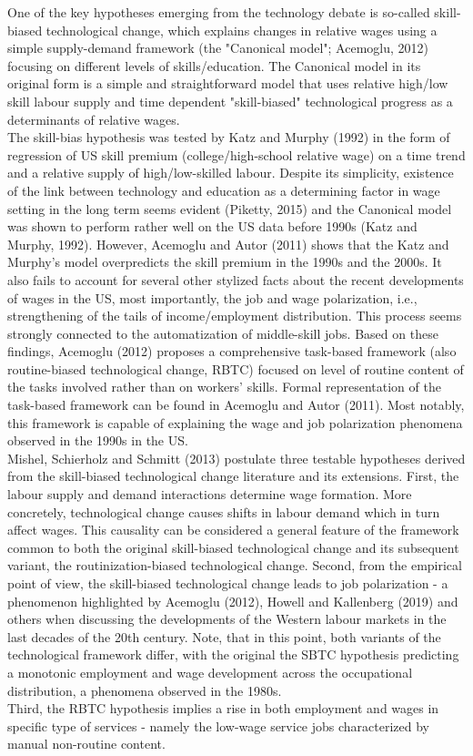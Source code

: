 \documentclass{article}
\begin{document}
One of the key hypotheses emerging from the technology debate is so-called skill-biased technological change, which explains changes in relative wages using a simple supply-demand framework (the "Canonical model"; Acemoglu, 2012) focusing on different levels of skills/education. The Canonical model in its original form is a simple and straightforward model that uses relative high/low skill labour supply and time dependent "skill-biased" technological progress as a determinants of relative wages.\\
The skill-bias hypothesis was tested by Katz and Murphy (1992) in the form of regression of US skill premium (college/high-school relative wage) on a time trend and a relative supply of high/low-skilled labour. Despite its simplicity, existence of the link between technology and education as a determining factor in wage setting in the long term seems evident (Piketty, 2015) and the Canonical model was shown to perform rather well on the US data before 1990s (Katz and Murphy, 1992).
However, Acemoglu and Autor (2011) shows that the Katz and Murphy's model overpredicts the skill premium in the 1990s and the 2000s. It also fails to account for several other stylized facts about the recent developments of wages in the US, most importantly, the job and wage polarization, i.e., strengthening of the tails of income/employment distribution. This process seems strongly connected to the automatization of middle-skill jobs. Based on these findings, Acemoglu (2012) proposes a comprehensive task-based framework (also routine-biased technological change, RBTC) focused on level of routine content of the tasks involved rather than on workers' skills. Formal representation of the task-based framework can be found in Acemoglu and Autor (2011). Most notably, this framework is capable of explaining the wage and job polarization phenomena observed in the 1990s in the US.\\

Mishel, Schierholz and Schmitt (2013) postulate three testable hypotheses derived from the skill-biased technological change literature and its extensions. First, the labour supply and demand interactions determine wage formation. More concretely, technological change causes shifts in labour demand which in turn affect wages. This causality can be considered a general feature of the framework common to both the original skill-biased technological change and its subsequent variant, the routinization-biased technological change. Second, from the empirical point of view, the skill-biased technological change leads to job polarization - a phenomenon highlighted by Acemoglu (2012), Howell and Kallenberg (2019) and others when discussing the developments of the Western labour markets in the last decades of the 20th century. Note, that in this point, both variants of the technological framework differ, with the original the SBTC hypothesis predicting a monotonic employment and wage development across the occupational distribution, a phenomena observed in the 1980s.\\
Third, the RBTC hypothesis implies a rise in both employment and wages in specific type of services - namely the low-wage service jobs characterized by manual non-routine content.
\end{document}
